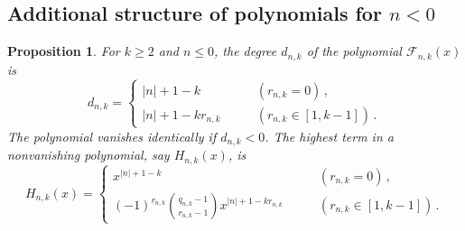 \documentclass[review]{elsarticle}
\theoremstyle{plain}
\newtheorem{proposition}[theorem]{Proposition}
\begin{document}
\subsection{Additional structure of polynomials for $n<0$}\label{sec:add_structpoly}
\begin{proposition}\label{prop:deg}
For $k\ge2$ and $n\le0$, the degree $d_{n,k}$ of the polynomial $\mathcal{F}_{n,k}(x)$ is 
\begin{equation}
\label{eq:deg_neg}    
d_{n,k} = \begin{cases} |n|+1-k &\qquad (r_{n,k}=0)\,, \\ |n|+1-kr_{n,k} &\qquad (r_{n,k}\in[1,k-1])\,.  \end{cases} 
\end{equation}
The polynomial vanishes identically if $d_{n,k}<0$.
The highest term in a nonvanishing polynomial, say $H_{n,k}(x)$, is %
\begin{equation}
\label{eq:high_term_neg}    
H_{n,k}(x) = \begin{cases} x^{|n|+1-k} &\qquad (r_{n,k}=0)\,,\phantom{\biggl|}
  \\ \displaystyle
  (-1)^{r_{n,k}} \binom{q_{n,k}-1}{r_{n,k}-1}x^{|n|+1-kr_{n,k}} &\qquad (r_{n,k}\in[1,k-1])\,. \end{cases} 
\end{equation}
\end{proposition}
\end{document}
